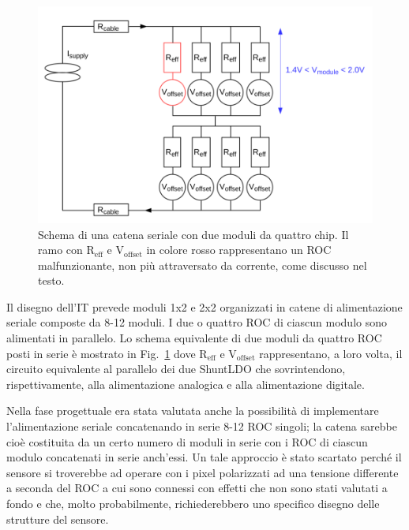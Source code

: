 \begin{figure}
\centering
\includegraphics[scale=.3]{Immagini/MultiChipModules}
\caption{Schema di una catena seriale con due moduli da quattro chip. Il ramo con $\mathrm{R_{eff}}$ e $\mathrm{V_{offset}}$ in colore rosso rappresentano un ROC malfunzionante, non pi\`u attraversato da corrente, come discusso nel testo.}
\label{MCM}
\end{figure}

Il disegno dell'IT prevede moduli 1x2 e 2x2 organizzati in catene di alimentazione seriale composte da 8-12 moduli. I due o quattro ROC di ciascun modulo sono alimentati in parallelo. Lo schema equivalente di due moduli da quattro ROC posti in serie \`e mostrato in Fig.~\ref{MCM} dove $\mathrm{R_{eff}}$ e $\mathrm{V_{offset}}$ rappresentano, a loro volta, il circuito equivalente al parallelo dei due ShuntLDO che sovrintendono, rispettivamente, alla alimentazione analogica e alla alimentazione digitale.

Nella fase progettuale era stata valutata anche la possibilit\`a di implementare l'alimentazione seriale concatenando in serie 8-12 ROC singoli; la catena sarebbe cio\`e costituita da un certo numero di moduli in serie con i ROC di ciascun modulo concatenati in serie anch'essi. Un tale approccio \`e stato scartato perch\'e il sensore si troverebbe ad operare con i pixel polarizzati ad una tensione differente a seconda del ROC a cui sono connessi con effetti che non sono stati valutati a fondo e che, molto probabilmente, richiederebbero uno specifico disegno delle strutture del sensore.

